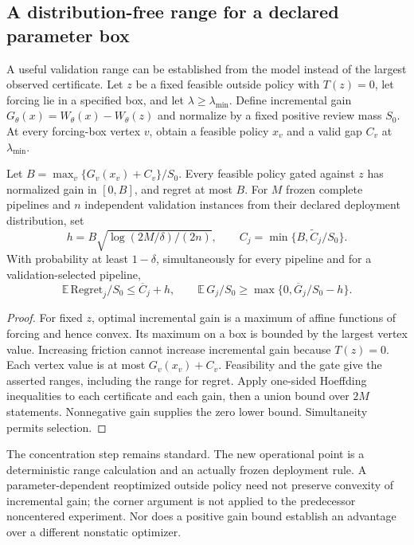\subsection{A distribution-free range for a declared parameter box}\label{sec:r13-range}
A useful validation range can be established from the model instead of the largest observed certificate. Let $z$ be a fixed feasible outside policy with $T(z)=0$, let forcing lie in a specified box, and let $\lambda\geq\lambda_{\min}$. Define incremental gain $G_\theta(x)=W_\theta(x)-W_\theta(z)$ and normalize by a fixed positive review mass $S_0$. At every forcing-box vertex $v$, obtain a feasible policy $x_v$ and a valid gap $C_v$ at $\lambda_{\min}$.
\begin{proposition}\label{prop:r13-range}
Let $B=\max_v\{G_v(x_v)+C_v\}/S_0$. Every feasible policy gated against $z$ has normalized gain in $[0,B]$, and regret at most $B$. For $M$ frozen complete pipelines and $n$ independent validation instances from their declared deployment distribution, set
\[
 h=B\sqrt{\log(2M/\delta)/(2n)},\qquad
 C_j=\min\{B,\widetilde C_j/S_0\}.
\]
With probability at least $1-\delta$, simultaneously for every pipeline and for a validation-selected pipeline,
\begin{equation}\label{eq:r13-validation}
 \mathbb E\,\mathrm{Regret}_j/S_0\leq\overline C_j+h,
 \qquad
 \mathbb E\,G_j/S_0\geq\max\{0,\overline G_j/S_0-h\}.
\end{equation}
\end{proposition}
\begin{proof}
For fixed $z$, optimal incremental gain is a maximum of affine functions of forcing and hence convex. Its maximum on a box is bounded by the largest vertex value. Increasing friction cannot increase incremental gain because $T(z)=0$. Each vertex value is at most $G_v(x_v)+C_v$. Feasibility and the gate give the asserted ranges, including the range for regret. Apply one-sided Hoeffding inequalities to each certificate and each gain, then a union bound over $2M$ statements. Nonnegative gain supplies the zero lower bound. Simultaneity permits selection.
\end{proof}
The concentration step remains standard. The new operational point is a deterministic range calculation and an actually frozen deployment rule. A parameter-dependent reoptimized outside policy need not preserve convexity of incremental gain; the corner argument is not applied to the predecessor noncentered experiment. Nor does a positive gain bound establish an advantage over a different nonstatic optimizer.

